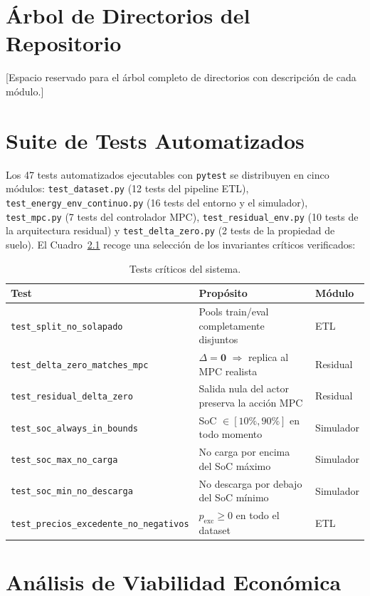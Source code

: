 \documentclass[12pt, a4paper, twoside]{report}
\begin{document}
\chapter{Árbol de Directorios del Repositorio}
\label{app:estructura}
[Espacio reservado para el árbol completo de directorios con descripción de
cada módulo.]

\chapter{Suite de Tests Automatizados}
\label{app:tests}

Los 47 tests automatizados ejecutables con \texttt{pytest} se distribuyen en
cinco módulos: \texttt{test\_dataset.py} (12 tests del pipeline ETL),
\texttt{test\_energy\_env\_continuo.py} (16 tests del entorno y el simulador),
\texttt{test\_mpc.py} (7 tests del controlador MPC),
\texttt{test\_residual\_env.py} (10 tests de la arquitectura residual) y
\texttt{test\_delta\_zero.py} (2 tests de la propiedad de suelo). El
Cuadro~\ref{tab:tests} recoge una selección de los invariantes críticos
verificados:

\begin{table}[H]
\centering
\caption{Tests críticos del sistema.}
\label{tab:tests}
\begin{tabularx}{\textwidth}{lXl}
\toprule
\textbf{Test} & \textbf{Propósito} & \textbf{Módulo} \\
\midrule
\texttt{test\_split\_no\_solapado} & Pools train/eval completamente disjuntos & ETL \\
\texttt{test\_delta\_zero\_matches\_mpc} & $\Delta=\mathbf{0}$ $\Rightarrow$ replica al MPC realista & Residual \\
\texttt{test\_residual\_delta\_zero} & Salida nula del actor preserva la acción MPC & Residual \\
\texttt{test\_soc\_always\_in\_bounds} & SoC $\in [10\%, 90\%]$ en todo momento & Simulador \\
\texttt{test\_soc\_max\_no\_carga} & No carga por encima del SoC máximo & Simulador \\
\texttt{test\_soc\_min\_no\_descarga} & No descarga por debajo del SoC mínimo & Simulador \\
\texttt{test\_precios\_excedente\_no\_negativos} & $p_{\text{exc}} \geq 0$ en todo el dataset & ETL \\
\bottomrule
\end{tabularx}
\end{table}

\chapter{Análisis de Viabilidad Económica}
\label{app:viabilidad}
\end{document}
